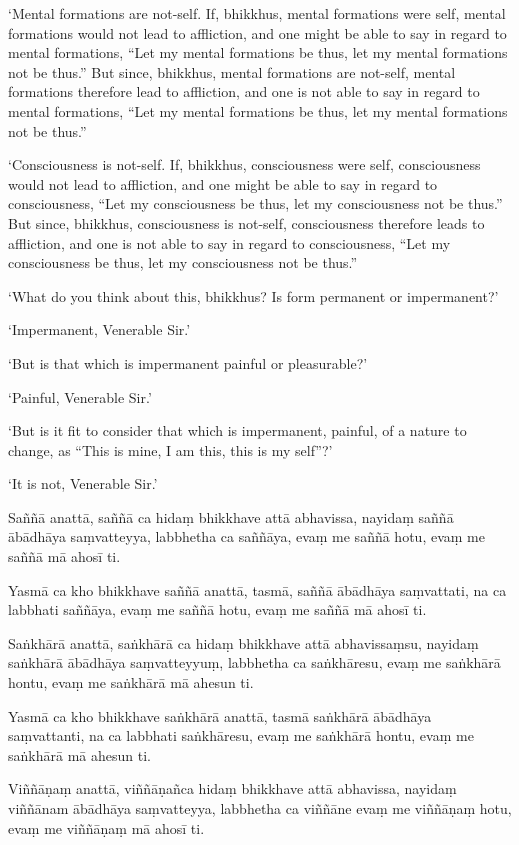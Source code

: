 ‘Mental formations are not-self. If, bhikkhus, mental formations were
self, mental formations would not lead to affliction, and one might be
able to say in regard to mental formations, “Let my mental formations be
thus, let my mental formations not be thus.” But since, bhikkhus, mental
formations are not-self, mental formations therefore lead to affliction,
and one is not able to say in regard to mental formations, “Let my
mental formations be thus, let my mental formations not be thus.”

‘Consciousness is not-self. If, bhikkhus, consciousness were self,
consciousness would not lead to affliction, and one might be able to say
in regard to consciousness, “Let my consciousness be thus, let my
consciousness not be thus.” But since, bhikkhus, consciousness is
not-self, consciousness therefore leads to affliction, and one is not
able to say in regard to consciousness, “Let my consciousness be thus,
let my consciousness not be thus.”

‘What do you think about this, bhikkhus? Is form permanent or
impermanent?’

‘Impermanent, Venerable Sir.’

‘But is that which is impermanent painful or pleasurable?’

‘Painful, Venerable Sir.’

‘But is it fit to consider that which is impermanent, painful, of a
nature to change, as “This is mine, I am this, this is my self”?’

‘It is not, Venerable Sir.’

\clearpage

\paliText
\markboth{\paliTitle}{\rightmark}

Saññā anattā, saññā ca hidaṃ bhikkhave attā abhavissa, nayidaṃ saññā
ābādhāya saṃvatteyya, labbhetha ca saññāya, evaṃ me saññā hotu, evaṃ me
saññā mā ahosī ti.

Yasmā ca kho bhikkhave saññā anattā, tasmā, saññā ābādhāya saṃvattati,
na ca labbhati saññāya, evaṃ me saññā hotu, evaṃ me saññā mā ahosī ti.

Saṅkhārā anattā, saṅkhārā ca hidaṃ bhikkhave attā abhavissaṃsu, nayidaṃ
saṅkhārā ābādhāya saṃvatteyyuṃ, labbhetha ca saṅkhāresu, evaṃ me
saṅkhārā hontu, evaṃ me saṅkhārā mā ahesun ti.

Yasmā ca kho bhikkhave saṅkhārā anattā, tasmā saṅkhārā ābādhāya
saṃvattanti, na ca labbhati saṅkhāresu, evaṃ me saṅkhārā hontu, evaṃ me
saṅkhārā mā ahesun ti.

Viññāṇaṃ anattā, viññāṇañca hidaṃ bhikkhave attā abhavissa, nayidaṃ
viññānam ābādhāya saṃvatteyya, labbhetha ca viññāne evaṃ me viññāṇaṃ
hotu, evaṃ me viññāṇaṃ mā ahosī ti.

